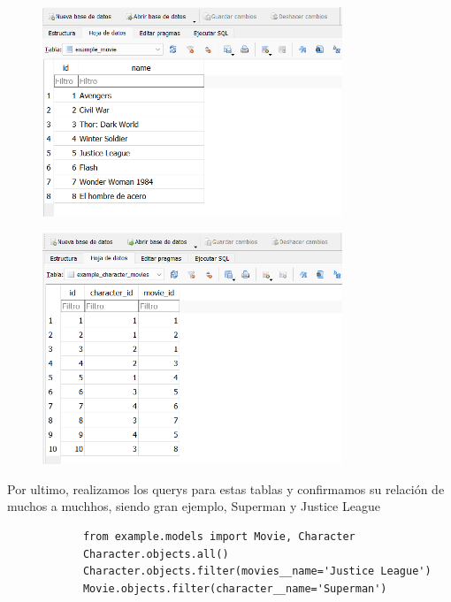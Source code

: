 \documentclass{article}
\begin{document}
\begin{enumerate}
\begin{figure}[H]
		\end{figure}
		\begin{figure}[H]
			\centering
			\includegraphics[width=0.8\textwidth,keepaspectratio]{img/Ejercicio2/bd-movie.png}
		\end{figure}
		\begin{figure}[H]
			\centering
			\includegraphics[width=0.8\textwidth,keepaspectratio]{img/Ejercicio2/bd-character-movie.png}
		\end{figure}
		Por ultimo, realizamos los querys para estas tablas y confirmamos su relación de muchos a muchhos, siendo gran ejemplo, Superman y Justice League
		\begin{lstlisting}
			from example.models import Movie, Character
			Character.objects.all()
			Character.objects.filter(movies__name='Justice League')
			Movie.objects.filter(character__name='Superman')

\end{lstlisting}
\end{enumerate}
\end{document}
